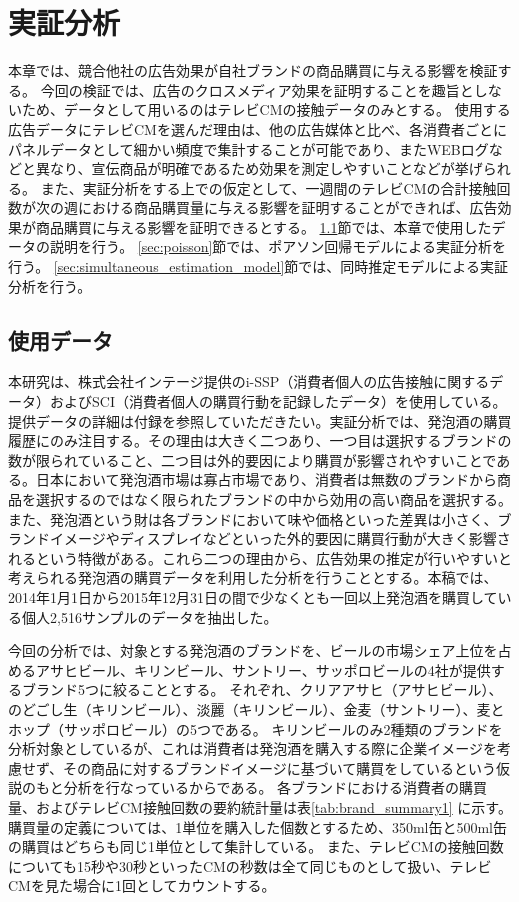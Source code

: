 \documentclass[11pt]{jsarticle}
\begin{document}
\section{実証分析}
\label{ch:empirical_analysis}

本章では、競合他社の広告効果が自社ブランドの商品購買に与える影響を検証する。
今回の検証では、広告のクロスメディア効果を証明することを趣旨としないため、データとして用いるのはテレビCMの接触データのみとする。
使用する広告データにテレビCMを選んだ理由は、他の広告媒体と比べ、各消費者ごとにパネルデータとして細かい頻度で集計することが可能であり、またWEBログなどと異なり、宣伝商品が明確であるため効果を測定しやすいことなどが挙げられる。
また、実証分析をする上での仮定として、一週間のテレビCMの合計接触回数が次の週における商品購買量に与える影響を証明することができれば、広告効果が商品購買に与える影響を証明できるとする。
\ref{sec:empirical_data}節では、本章で使用したデータの説明を行う。
\ref{sec:poisson}節では、ポアソン回帰モデルによる実証分析を行う。
\ref{sec:simultaneous_estimation_model}節では、同時推定モデルによる実証分析を行う。

\subsection{使用データ}
\label{sec:empirical_data}
本研究は、株式会社インテージ提供のi-SSP（消費者個人の広告接触に関するデータ）およびSCI（消費者個人の購買行動を記録したデータ）を使用している。提供データの詳細は付録を参照していただきたい。実証分析では、発泡酒の購買履歴にのみ注目する。その理由は大きく二つあり、一つ目は選択するブランドの数が限られていること、二つ目は外的要因により購買が影響されやすいことである。日本において発泡酒市場は寡占市場であり、消費者は無数のブランドから商品を選択するのではなく限られたブランドの中から効用の高い商品を選択する。また、発泡酒という財は各ブランドにおいて味や価格といった差異は小さく、ブランドイメージやディスプレイなどといった外的要因に購買行動が大きく影響されるという特徴がある。これら二つの理由から、広告効果の推定が行いやすいと考えられる発泡酒の購買データを利用した分析を行うこととする。本稿では、2014年1月1日から2015年12月31日の間で少なくとも一回以上発泡酒を購買している個人2,516サンプルのデータを抽出した。

今回の分析では、対象とする発泡酒のブランドを、ビールの市場シェア上位を占めるアサヒビール、キリンビール、サントリー、サッポロビールの4社が提供するブランド5つに絞ることとする。
それぞれ、クリアアサヒ（アサヒビール）、のどごし生（キリンビール）、淡麗（キリンビール）、金麦（サントリー）、麦とホップ（サッポロビール）の5つである。
キリンビールのみ2種類のブランドを分析対象としているが、これは消費者は発泡酒を購入する際に企業イメージを考慮せず、その商品に対するブランドイメージに基づいて購買をしているという仮説のもと分析を行なっているからである。
各ブランドにおける消費者の購買量、およびテレビCM接触回数の要約統計量は表\ref{tab:brand_summary1} に示す。
購買量の定義については、1単位を購入した個数とするため、350ml缶と500ml缶の購買はどちらも同じ1単位として集計している。
また、テレビCMの接触回数についても15秒や30秒といったCMの秒数は全て同じものとして扱い、テレビCMを見た場合に1回としてカウントする。
\end{document}
